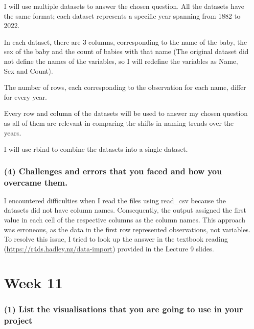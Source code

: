 \documentclass[
]{article}
\begin{document}
I will use multiple datasets to answer the chosen question. All the
datasets have the same format; each dataset represents a specific year
spanning from 1882 to 2022.

In each dataset, there are 3 columns, corresponding to the name of the
baby, the sex of the baby and the count of babies with that name (The
original dataset did not define the names of the variables, so I will
redefine the variables as Name, Sex and Count).

The number of rows, each corresponding to the observation for each name,
differ for every year.

Every row and column of the datasets will be used to answer my chosen
question as all of them are relevant in comparing the shifts in naming
trends over the years.

I will use rbind to combine the datasets into a single dataset.

\hypertarget{challenges-and-errors-that-you-faced-and-how-you-overcame-them.}{%
\subsubsection{(4) Challenges and errors that you faced and how you
overcame
them.}\label{challenges-and-errors-that-you-faced-and-how-you-overcame-them.}}

I encountered difficulties when I read the files using read\_csv because
the datasets did not have column names. Consequently, the output
assigned the first value in each cell of the respective columns as the
column names. This approach was erroneous, as the data in the first row
represented observations, not variables. To resolve this issue, I tried
to look up the answer in the textbook reading
(\url{https://r4ds.hadley.nz/data-import}) provided in the Lecture 9
slides.

\hypertarget{week-11}{%
\section{Week 11}\label{week-11}}

\hypertarget{list-the-visualisations-that-you-are-going-to-use-in-your-project}{%
\subsubsection{(1) List the visualisations that you are going to use in
your
project}\label{list-the-visualisations-that-you-are-going-to-use-in-your-project}}
\end{document}
